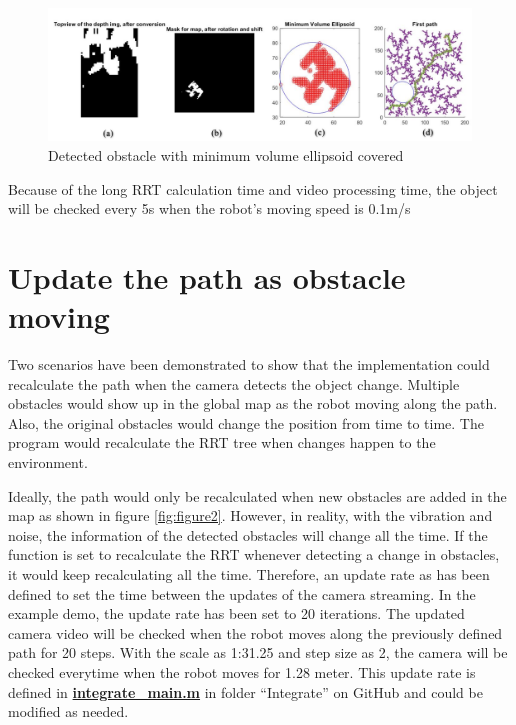 \documentclass[
  oneside]{ubcthesis}
\begin{document}
\begin{figure}

{\centering \includegraphics[width=0.9\linewidth]{figures/9} 

}

\caption{Detected obstacle with minimum volume ellipsoid covered}\label{fig:figure9}
\end{figure}



Because of the long RRT calculation time and video processing time, the object will be checked every 5s when the robot's moving speed is 0.1m/s

\hypertarget{update-the-path-as-obstacle-moving}{%
\section{Update the path as obstacle moving}\label{update-the-path-as-obstacle-moving}}

Two scenarios have been demonstrated to show that the implementation could recalculate the path when the camera detects the object change. Multiple obstacles would show up in the global map as the robot moving along the path. Also, the original obstacles would change the position from time to time. The program would recalculate the RRT tree when changes happen to the environment.

Ideally, the path would only be recalculated when new obstacles are added in the map as shown in figure \ref{fig:figure2}. However, in reality, with the vibration and noise, the information of the detected obstacles will change all the time. If the function is set to recalculate the RRT whenever detecting a change in obstacles, it would keep recalculating all the time. Therefore, an update rate as has been defined to set the time between the updates of the camera streaming. In the example demo, the update rate has been set to 20 iterations. The updated camera video will be checked when the robot moves along the previously defined path for 20 steps. With the scale as 1:31.25 and step size as 2, the camera will be checked everytime when the robot moves for 1.28 meter. This update rate is defined in \textbf{\href{https://github.com/luckymeng7/EECE597/blob/master/Integrate/integrate_main.m}{integrate\_main.m}} in folder ``Integrate'' on GitHub and could be modified as needed.
\end{document}
